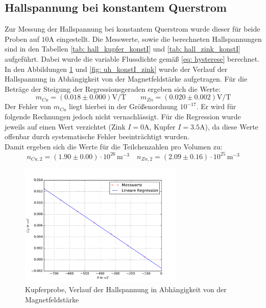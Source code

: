 \subsection{Hallspannung bei konstantem Querstrom}
Zur Messung der Hallspannung bei konstantem Querstrom wurde dieser für beide Proben auf $10\si{\ampere}$ eingestellt. Die%
Messwerte, sowie die berechneten Hallspannungen sind in den Tabellen \ref{tab: hall_kupfer_konstI} und \ref{tab: hall_zink_konstI} aufgeführt. Dabei wurde
die variable Flussdichte gemäß \eqref{eq: hysterese} berechnet. In den Abbildungen \ref{fig: uh_konstI_kupfer} und \ref{fig: uh_konstI_zink}
wurde der Verlauf der Hallspannung in Abhängigkeit von der Magnetfeldstärke aufgetragen. Für die Beträge der Steigung der Regressionsgeraden
ergeben sich die Werte:
\begin{equation}
  m_{Cu} = (0.018 \pm 0.000)\si{\volt \per \tesla }  \quad \quad m_{Zn} = (0.020 \pm 0.002)\si{\volt \per \tesla}%
\end{equation}
Der Fehler von $m_{Cu}$ liegt hierbei in der Größenordnung $10^{-17}$. Er wird für folgende Rechnungen jedoch nicht vernachlässigt.
Für die Regression wurde jeweils auf einen Wert verzichtet (Zink $I = 0 \si{\ampere}$, Kupfer $I = 3.5\si{\ampere}$), da diese Werte offenbar%
durch systematische Fehler beeinträchtigt wurden.\\
Damit ergeben sich die Werte für die Teilchenzahlen pro Volumen zu:
\begin{equation}
  n_{Cu,2} = (1.90 \pm 0.00)\cdot 10^{26}\,\si{ \meter^{-3}} \quad n_{Zn,2} = (2.09\pm 0.16)\cdot 10^{25}\,\si{ \meter^{-3}}%
\end{equation}
  \centering
  \centering
\begin{figure}
  \centering
  \includegraphics[width=0.7\textwidth]{pics/u_h_kupfer_konstI.pdf}
  \caption{Kupferprobe, Verlauf der Hallspannung in Abhängigkeit von der Magnetfeldstärke}
  \label{fig: uh_konstI_kupfer}
\end{figure}
